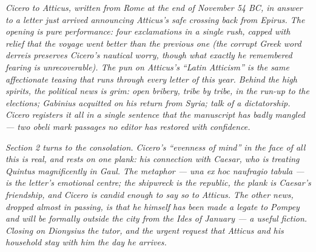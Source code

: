 
\textit{Cicero to Atticus, written from Rome at the end of November
54 BC, in answer to a letter just arrived announcing Atticus's safe
crossing back from Epirus. The opening is pure performance: four
exclamations in a single rush, capped with relief that the voyage
went better than the previous one (the corrupt Greek word
\textit{derreis} preserves Cicero's nautical worry, though what
exactly he remembered fearing is unrecoverable). The pun on Atticus's
``Latin Atticism'' is the same affectionate teasing that runs
through every letter of this year. Behind the high spirits, the
political news is grim: open bribery, tribe by tribe, in the
run-up to the elections; Gabinius acquitted on his return from
Syria; talk of a dictatorship. Cicero registers it all in a single
sentence that the manuscript has badly mangled --- two obeli mark
passages no editor has restored with confidence.}

\textit{Section 2 turns to the consolation. Cicero's ``evenness of
mind'' in the face of all this is real, and rests on one plank:
his connection with Caesar, who is treating Quintus magnificently
in Gaul. The metaphor --- \textit{una ex hoc naufragio tabula} ---
is the letter's emotional centre; the shipwreck is the republic,
the plank is Caesar's friendship, and Cicero is candid enough to
say so to Atticus. The other news, dropped almost in passing, is
that he himself has been made a legate to Pompey and will be
formally outside the city from the Ides of January --- a useful
fiction. Closing on Dionysius the tutor, and the urgent
request that Atticus and his household stay with him the day he
arrives.}
